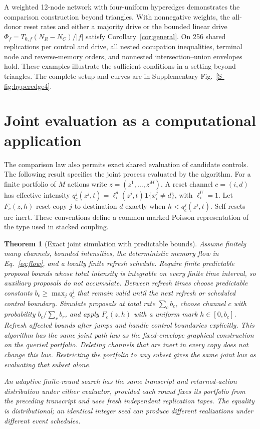 \documentclass[final,5p,times,twocolumn,sort&compress]{elsarticle}
\theoremstyle{plain}
\newtheorem{theorem}{Theorem}
\newcommand{\ind}{\mathbf{1}}
\begin{document}
A weighted 12-node network with four-uniform hyperedges demonstrates the comparison construction beyond triangles. With nonnegative weights, the all-donor reset rates and either a majority drive or the bounded linear drive $\Phi_f=T_{0,f}(N_R-N_C)/|f|$ satisfy Corollary~\ref{cor:general}. On 256 shared replications per control and drive, all nested occupation inequalities, terminal node and reverse-memory orders, and nonnested intersection--union envelopes hold. These examples illustrate the sufficient conditions in a setting beyond triangles. The complete setup and curves are in Supplementary Fig.~\ref{S-fig:hyperedge4}.

\section{Joint evaluation as a computational application}
The comparison law also permits exact shared evaluation of candidate controls. The following result specifies the joint process evaluated by the algorithm.
For a finite portfolio of $M$ actions write $z=(z^1,\ldots,z^M)$. A reset channel $c=(i,d)$ has effective intensity
$q_c^j(z^j,t)=\ell_i^d(z^j,t)\ind\{x_i^j\ne d\}$, with $\ell_i^U=1$.
Let $F_c(z,h)$ reset copy $j$ to destination $d$ exactly when $h<q_c^j(z^j,t)$. Self resets are inert. These conventions define a common marked-Poisson representation of the type used in stacked coupling.
\begin{theorem}[Exact joint simulation with predictable bounds]
\label{thm:batch}
Assume finitely many channels, bounded intensities, the deterministic memory flow in Eq.~\ref{eq:flow}, and a locally finite refresh schedule. Require finite predictable proposal bounds whose total intensity is integrable on every finite time interval, so auxiliary proposals do not accumulate. Between refresh times choose predictable constants $b_c\ge\max_j q_c^j$ that remain valid until the next refresh or scheduled control boundary. Simulate proposals at total rate $\sum_cb_c$, choose channel $c$ with probability $b_c/\sum_rb_r$, and apply $F_c(z,h)$ with a uniform mark $h\in[0,b_c]$. Refresh affected bounds after jumps and handle control boundaries explicitly. This algorithm has the same joint path law as the fixed-envelope graphical construction on the queried portfolio. Deleting channels that are inert in every copy does not change this law. Restricting the portfolio to any subset gives the same joint law as evaluating that subset alone.

An adaptive finite-round search has the same transcript and returned-action distribution under either evaluator, provided each round fixes its portfolio from the preceding transcript and uses fresh independent replication tapes. The equality is distributional; an identical integer seed can produce different realizations under different event schedules.
\end{theorem}
\end{document}
